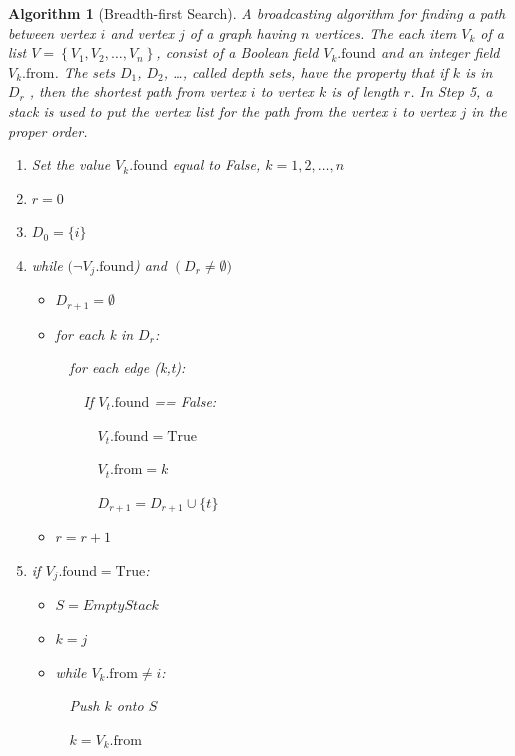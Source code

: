 \documentclass[10pt,]{book}
\theoremstyle{plain}
\newtheorem{algorithm}[theorem]{Algorithm}
\theoremstyle{definition}
\theoremstyle{definition}
\theoremstyle{definition}
\theoremstyle{definition}
\theoremstyle{definition}
\numberwithin{equation}{section}
\begin{document}
\begin{algorithm}[Breadth-first Search]\label{alg-breadth-first}
A broadcasting algorithm for finding a path between vertex \(i\) and vertex \(j\) of a graph having \(n\) vertices. The each item \(V_k\) of a list \(V=\left\{V_1, V_2, \ldots , V_n\right\}\), consist of a Boolean field \(V_k.\text{found}\) and an
integer field \(V_k.\text{from}\). The sets \(D_1\), \(D_2\), \dots, called  depth sets, have the property that if \(k\) is in
\(D_r\) , then the shortest path from vertex \(i\) to vertex \(k\) is of length \(r\). In Step 5, a stack is used to put the vertex list for the path from the vertex \(i\) to vertex \(j\) in the proper order.%
\par
\leavevmode%
\begin{enumerate}[label=\arabic*]
\item\hypertarget{li-49}{}Set the value \(V_k.\text{found}\) equal to False, \(k = 1, 2, \dots , n\)%
\item\hypertarget{li-50}{}\(r = 0\)%
\item\hypertarget{li-51}{} \(D_0= \{i\}\)%
\item\hypertarget{li-52}{} while \((\neg V_j.\text{found}\)) and \(\left(D_r\right.\neq \emptyset )\)%
\par
%
\begin{itemize}[label=\textbullet]
\item{}\(D_{r+1}=\emptyset\)%
\item{} for each k in \(D_r\):%
\par
\(\quad\)for each edge (k,t):%
\par
\(\quad \quad \)If \(V_t.\text{found}\) == False: %
\par
\(\quad \quad \quad \)\(V_t.\text{found}=\text{True}\)%
\par
\(\quad \quad \quad \)\(V_t.\text{from} = k\)%
\par
\(\quad \quad \quad \)\(D_{r+1}=D_{r+1}\cup \{t\}\)%
\item{}\(r = r + 1\)%
\end{itemize}
%
\item\hypertarget{li-56}{}if \(V_j.\text{found} = \text{True}\):%
\par
%
\begin{itemize}[label=\textbullet]
\item{}\(S = Empty Stack\)%
\item{}\(k=j\)%
\item{}while \(V_k.\text{from} \neq  i\):%
\par
\(\quad\)Push \(k\) onto \(S\)%
\par
\(\quad\)\(k = V_k.\text{from}\)%
\end{itemize}
%
\end{enumerate}
%
\end{algorithm}
\end{document}
